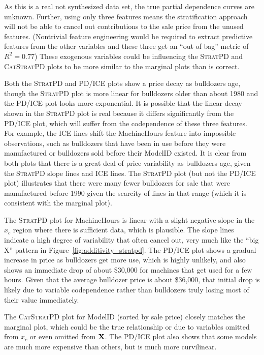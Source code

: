 \documentclass[12pt]{article}
\newcommand{\figref}[1]{Figure~\ref{#1}}
\newcommand{\spd}{\fontfamily{cmr}\textsc{\small StratPD}}
\newcommand{\cspd}{\fontfamily{cmr}\textsc{\small CatStratPD}}
\newcommand{\xnc}{$x_{\overline{c}}$}
\begin{document}
As this is a real not synthesized data set, the true partial dependence curves are unknown. Further, using only three features means the stratification approach will not be able to cancel out contributions to the sale price from the unused features. (Nontrivial feature engineering would be required to extract predictive features from the other variables and these three get an ``out of bag'' metric of $R^2=0.77$) These exogenous variables could be influencing the \spd{} and \cspd{} plots to be more similar to the marginal plots than is correct.

Both the \spd{} and PD/ICE plots show a price decay as bulldozers age, though the \spd{} plot is more linear for bulldozers older than about 1980 and the PD/ICE plot looks more exponential. It is possible that the linear decay shown in the \spd{} plot is real because it differs significantly from the PD/ICE plot, which will suffer from the codependence of these three features. For example, the ICE lines shift the MachineHours feature into impossible observations, such as bulldozers that have been in use before they were manufactured or bulldozers sold before their ModelID existed. It is clear from both plots that there is a great deal of price variability as bulldozers age, given the \spd{} slope lines and ICE lines.  The \spd{} plot (but not the PD/ICE plot) illustrates that there were many fewer bulldozers for sale that were manufactured before 1990 given the scarcity of lines in that range (which it is consistent with the marginal plot).

The \spd{} plot for MachineHours is linear with a slight negative slope in the $x_c$ region where there is sufficient data, which is plausible.  The slope lines indicate a high degree of variability that often cancel out, very much like the ``big X'' pattern in \figref{fig:additivity_stratpd}. The PD/ICE plot shows a gradual increase in price as bulldozers get more use, which is highly unlikely, and also shows an immediate drop of about \$30,000 for machines that get used for a few hours. Given that the average bulldozer price is about \$36,000, that initial drop is likely due to variable codependence rather than bulldozers truly losing most of their value immediately.

The \cspd{} plot for ModelID (sorted by sale price) closely matches the marginal plot, which could be the true relationship or due to variables omitted from \xnc{} or even omitted from $\bf X$. The PD/ICE plot also shows that some models are much more expensive than others, but is much more curvilinear.
\end{document}
